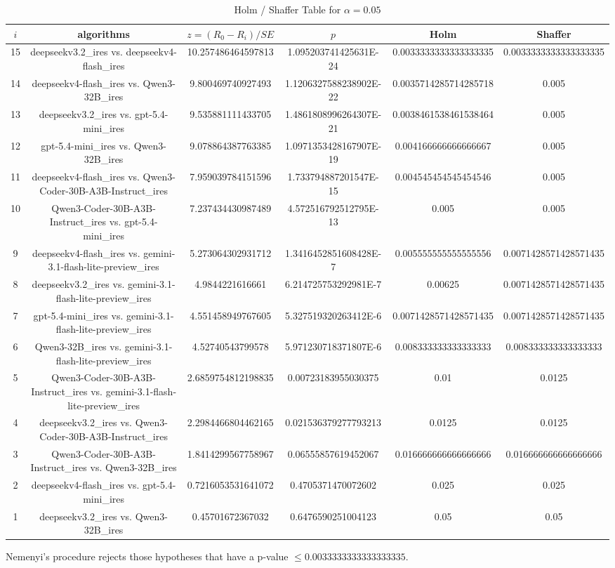 \documentclass[a4paper,10pt]{article}
\begin{document}
\begin{landscape}
\begin{table}[!htp]
\centering\tiny
\caption{Holm / Shaffer Table for $\alpha=0.05$}
\begin{tabular}{cccccc}
$i$&algorithms&$z=(R_0 - R_i)/SE$&$p$&Holm&Shaffer\\
\hline
15&deepseekv3.2_ires vs. deepseekv4-flash_ires&10.257486464597813&1.095203741425631E-24&0.0033333333333333335&0.0033333333333333335\\14&deepseekv4-flash_ires vs. Qwen3-32B_ires&9.800469740927493&1.1206327588238902E-22&0.0035714285714285718&0.005\\13&deepseekv3.2_ires vs. gpt-5.4-mini_ires&9.535881111433705&1.4861808996264307E-21&0.0038461538461538464&0.005\\12&gpt-5.4-mini_ires vs. Qwen3-32B_ires&9.078864387763385&1.0971353428167907E-19&0.004166666666666667&0.005\\11&deepseekv4-flash_ires vs. Qwen3-Coder-30B-A3B-Instruct_ires&7.959039784151596&1.733794887201547E-15&0.004545454545454546&0.005\\10&Qwen3-Coder-30B-A3B-Instruct_ires vs. gpt-5.4-mini_ires&7.237434430987489&4.572516792512795E-13&0.005&0.005\\9&deepseekv4-flash_ires vs. gemini-3.1-flash-lite-preview_ires&5.273064302931712&1.3416452851608428E-7&0.005555555555555556&0.0071428571428571435\\8&deepseekv3.2_ires vs. gemini-3.1-flash-lite-preview_ires&4.9844221616661&6.214725753292981E-7&0.00625&0.0071428571428571435\\7&gpt-5.4-mini_ires vs. gemini-3.1-flash-lite-preview_ires&4.551458949767605&5.327519320263412E-6&0.0071428571428571435&0.0071428571428571435\\6&Qwen3-32B_ires vs. gemini-3.1-flash-lite-preview_ires&4.52740543799578&5.971230718371807E-6&0.008333333333333333&0.008333333333333333\\5&Qwen3-Coder-30B-A3B-Instruct_ires vs. gemini-3.1-flash-lite-preview_ires&2.6859754812198835&0.00723183955030375&0.01&0.0125\\4&deepseekv3.2_ires vs. Qwen3-Coder-30B-A3B-Instruct_ires&2.2984466804462165&0.021536379277793213&0.0125&0.0125\\3&Qwen3-Coder-30B-A3B-Instruct_ires vs. Qwen3-32B_ires&1.8414299567758967&0.06555857619452067&0.016666666666666666&0.016666666666666666\\2&deepseekv4-flash_ires vs. gpt-5.4-mini_ires&0.7216053531641072&0.4705371470072602&0.025&0.025\\1&deepseekv3.2_ires vs. Qwen3-32B_ires&0.45701672367032&0.6476590251004123&0.05&0.05\\\hline
\end{tabular}
\end{table}
Nemenyi's procedure rejects those hypotheses that have a p-value $\le0.0033333333333333335$.



\end{landscape}
\end{document}
